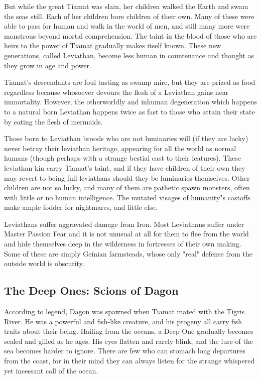 But while the great Tiamat was slain, her children walked the Earth and swam the seas still. Each of her children bore children of their own. Many of these were able to pass for human and walk in the world of men, and still many more were monstrous beyond mortal comprehension. The taint in the blood of those who are heirs to the power of Tiamat gradually makes itself known. These new generations, called Leviathan, become less human in countenance and thought as they grow in age and power.

Tiamat's descendants are foul tasting as swamp mire, but they are prized as food regardless because whosoever devours the flesh of a Leviathan gains near immortality. However, the otherworldly and inhuman degeneration which happens to a natural born Leviathan happens twice as fast to those who attain their state by eating the flesh of mermaids.

Those born to Leviathan broods who are not luminaries will (if they are lucky) never betray their leviathan heritage, appearing for all the world as normal humans (though perhaps with a strange bestial cast to their features). These leviathan kin carry Tiamat's taint, and if they have children of their own they may revert to being full leviathans should they be luminaries themselves. Other children are not so lucky, and many of them are pathetic spawn monsters, often with little or no human intelligence. The mutated visages of humanity"s castoffs make ample fodder for nightmares, and little else.

Leviathans suffer aggravated damage from Iron. Most Leviathans suffer under Master Passion Fear and it is not unusual at all for them to flee from the world and hide themselves deep in the wilderness in fortresses of their own making. Some of these are simply Geinian farmsteads, whose only "real" defense from the outside world is obscurity.

\subsection[Deep Ones]{The Deep Ones: Scions of Dagon} 

According to legend, Dagon was spawned when Tiamat mated with the Tigris River. He was a powerful and fish-like creature, and his progeny all carry fish traits about their being. Hailing from the oceans, a Deep One gradually becomes scaled and gilled as he ages. His eyes flatten and rarely blink, and the lure of the sea becomes harder to ignore. There are few who can stomach long departures from the coast, for in their mind they can always listen for the strange whispered yet incessant call of the ocean.

